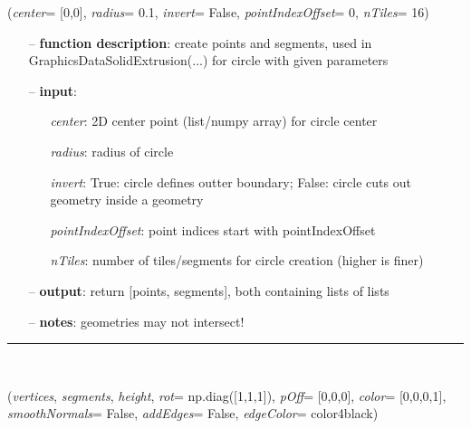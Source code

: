 \begin{itemize}[leftmargin=1.4cm]
\begin{itemize}[leftmargin=1.4cm]
\begin{itemize}[leftmargin=0.5cm]
\begin{itemize}[leftmargin=1.4cm]
\begin{itemize}[leftmargin=1.4cm]
\begin{itemize}[leftmargin=0.5cm]
\begin{itemize}[leftmargin=1.4cm]
\begin{itemize}[leftmargin=0.5cm]
\begin{flushleft}
\label{sec:graphicsDataUtilities:CirclePointsAndSegments}
({\it center}= [0,0], {\it radius}= 0.1, {\it invert}= False, {\it pointIndexOffset}= 0, {\it nTiles}= 16)
\end{flushleft}
\setlength{\itemindent}{0.7cm}
\begin{itemize}[leftmargin=0.7cm]
\item[--]{\bf function description}: create points and segments, used in GraphicsDataSolidExtrusion(...) for circle with given parameters
\item[--]{\bf input}: \vspace{-6pt}
\begin{itemize}[leftmargin=1.2cm]
\setlength{\itemindent}{-0.7cm}
\item[]{\it center}: 2D center point (list/numpy array) for circle center
\item[]{\it radius}: radius of circle
\item[]{\it invert}: True: circle defines outter boundary; False: circle cuts out geometry inside a geometry
\item[]{\it pointIndexOffset}: point indices start with pointIndexOffset
\item[]{\it nTiles}: number of tiles/segments for circle creation (higher is finer)
\end{itemize}
\item[--]{\bf output}: return [points, segments], both containing lists of lists
\item[--]{\bf notes}: geometries may not intersect!
\vspace{12pt}\end{itemize}
%
\noindent\rule{8cm}{0.75pt}\vspace{1pt} \\ 
\begin{flushleft}
\label{sec:graphicsDataUtilities:GraphicsDataSolidExtrusion}
({\it vertices}, {\it segments}, {\it height}, {\it rot}= np.diag([1,1,1]), {\it pOff}= [0,0,0], {\it color}= [0,0,0,1], {\it smoothNormals}= False, {\it addEdges}= False, {\it edgeColor}= color4black)
\end{flushleft}
\setlength{\itemindent}{0.7cm}
\begin{itemize}[leftmargin=0.7cm]

\end{itemize}
\end{itemize}
\end{itemize}
\end{itemize}
\end{itemize}
\end{itemize}
\end{itemize}
\end{itemize}
\end{itemize}

